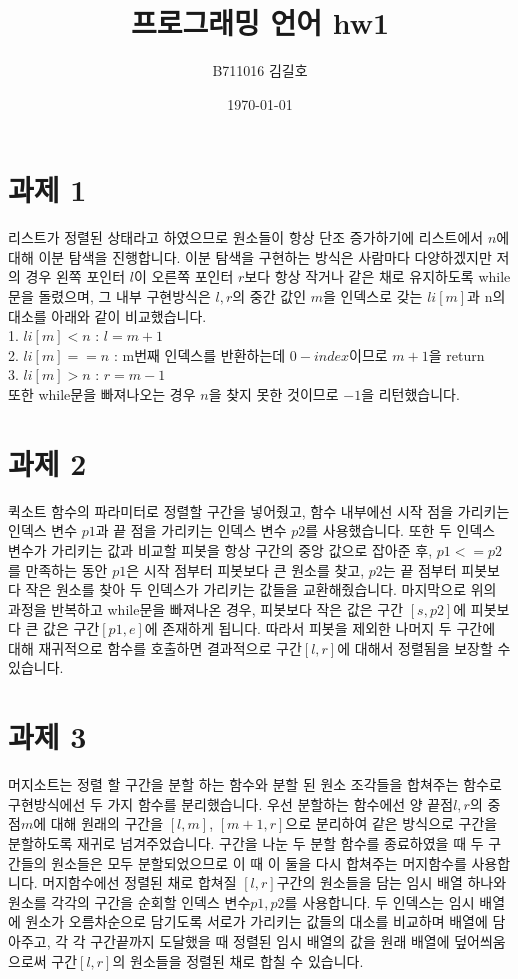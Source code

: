 \documentclass{article}
\title{프로그래밍 언어 hw1}
\author{B711016 김길호}
\date{\today}
\begin{document}
\maketitle
\newpage

\section{과제 1}
리스트가 정렬된 상태라고 하였으므로 원소들이 항상 단조 증가하기에 리스트에서 $n$에 대해 이분 탐색을 진행합니다.
이분 탐색을 구현하는 방식은 사람마다 다양하겠지만 저의 경우 왼쪽 포인터 $l$이 오른쪽 포인터 $r$보다 항상 작거나 같은 채로 유지하도록
while문을 돌렸으며, 그 내부 구현방식은 $l, r$의 중간 값인 $m$을 인덱스로 갖는 $li[m]$과 n의 대소를 아래와 같이 비교했습니다.\\ 
 1. $li[m] < n$ : $l = m + 1$\\
 2. $li[m] == n$ : m번째 인덱스를 반환하는데 $0-index$이므로 $m + 1$을 return\\
 3. $li[m] > n$ : $r = m - 1$\\
또한 while문을 빠져나오는 경우 $n$을 찾지 못한 것이므로 $-1$을 리턴했습니다.

\section{과제 2}
퀵소트 함수의 파라미터로 정렬할 구간을 넣어줬고, 함수 내부에선 시작 점을 가리키는 인덱스 변수 $p1$과 끝 점을 가리키는 인덱스 변수 $p2$를 사용했습니다.
또한 두 인덱스 변수가 가리키는 값과 비교할 피봇을 항상 구간의 중앙 값으로 잡아준 후, $p1<=p2$를 만족하는 동안 $p1$은 시작 점부터 피봇보다 큰 원소를 찾고, $p2$는 끝 점부터 피봇보다 작은 원소를 찾아 두 인덱스가 가리키는 값들을 교환해줬습니다.
마지막으로 위의 과정을 반복하고 while문을 빠져나온 경우, 피봇보다 작은 값은 구간 $[s, p2]$에 피봇보다 큰 값은 구간$[p1, e]$에 존재하게 됩니다. 따라서 피봇을 제외한 나머지 두 구간에 대해 재귀적으로 함수를 호출하면 결과적으로 구간$[l, r]$에 대해서 정렬됨을 보장할 수 있습니다.

\newpage
\section{과제 3}
머지소트는 정렬 할 구간을 분할 하는 함수와 분할 된 원소 조각들을 합쳐주는 함수로 구현방식에선 두 가지 함수를 분리했습니다.
우선 분할하는 함수에선 양 끝점$l, r$의 중점$ m $에 대해 원래의 구간을 $[l, m]$, $[m + 1, r]$으로 분리하여 같은 방식으로 구간을 분할하도록 재귀로 넘겨주었습니다.
구간을 나눈 두 분할 함수를 종료하였을 때 두 구간들의 원소들은 모두 분할되었으므로 이 때 이 둘을 다시 합쳐주는 머지함수를 사용합니다. 
머지함수에선 정렬된 채로 합쳐질 $[l, r]$구간의 원소들을 담는 임시 배열 하나와 원소를 각각의 구간을 순회할 인덱스 변수$p1, p2$를 사용합니다.
두 인덱스는 임시 배열에 원소가 오름차순으로 담기도록 서로가 가리키는 값들의 대소를 비교하며 배열에 담아주고, 각 각 구간끝까지 도달했을 때 정렬된 임시 배열의 값을 원래 배열에 덮어씌움으로써 구간$[l, r]$의 원소들을 정렬된 채로 합칠 수 있습니다. 
\end{document}
